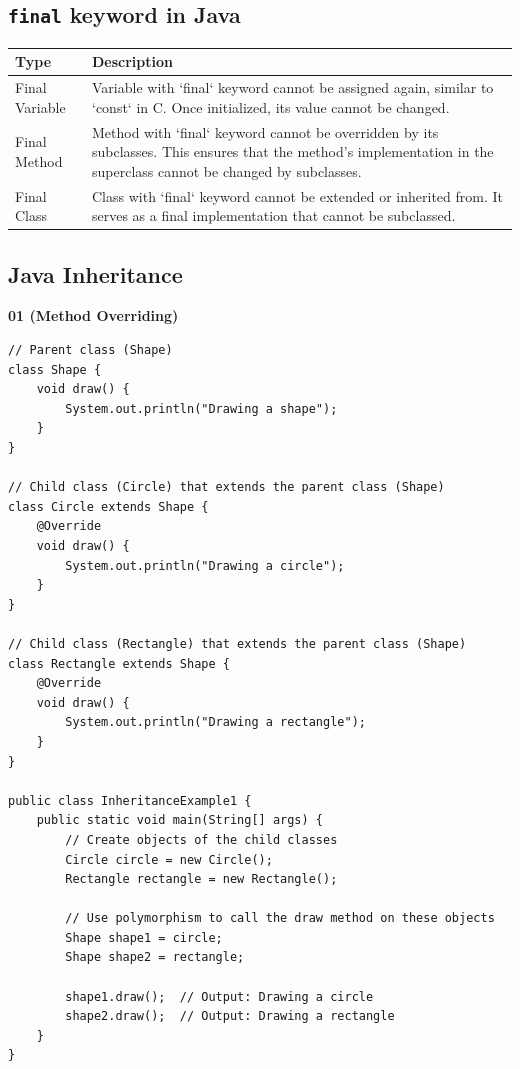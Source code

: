 \documentclass{book}
\begin{document}
\subsection{\texttt{final} keyword in Java}

\begin{center}
	\begin{tabular}{|l|p{10cm}|}
		\hline
		\textbf{Type}  & \textbf{Description}                                                                                                                                                 \\
		\hline
		Final Variable & Variable with `final` keyword cannot be assigned again, similar to `const` in C. Once initialized, its value cannot be changed.                                      \\
		\hline
		Final Method   & Method with `final` keyword cannot be overridden by its subclasses. This ensures that the method's implementation in the superclass cannot be changed by subclasses. \\
		\hline
		Final Class    & Class with `final` keyword cannot be extended or inherited from. It serves as a final implementation that cannot be subclassed.                                      \\
		\hline
	\end{tabular}
\end{center}

\subsection{Java Inheritance}

\textbf{01 (Method Overriding)}

\begin{verbatim}
// Parent class (Shape)
class Shape {
    void draw() {
        System.out.println("Drawing a shape");
    }
}

// Child class (Circle) that extends the parent class (Shape)
class Circle extends Shape {
    @Override
    void draw() {
        System.out.println("Drawing a circle");
    }
}

// Child class (Rectangle) that extends the parent class (Shape)
class Rectangle extends Shape {
    @Override
    void draw() {
        System.out.println("Drawing a rectangle");
    }
}

public class InheritanceExample1 {
    public static void main(String[] args) {
        // Create objects of the child classes
        Circle circle = new Circle();
        Rectangle rectangle = new Rectangle();

        // Use polymorphism to call the draw method on these objects
        Shape shape1 = circle;
        Shape shape2 = rectangle;

        shape1.draw();  // Output: Drawing a circle
        shape2.draw();  // Output: Drawing a rectangle
    }
}
\end{verbatim}
\end{document}
